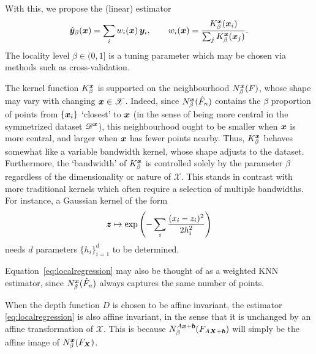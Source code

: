 With this, we propose the (linear) estimator
\begin{equation}
    \hat{\bm{y}}_\beta(\bm{x}) = \sum_i w_i(\bm{x})\, \bm{y}_i, \qquad
    w_i(\bm{x}) = \frac{K^{\bm{x}}_\beta(\bm{x}_i)}{\sum_j K^{\bm{x}}_\beta(\bm{x}_j)}.
    \label{eq:localregression}
\end{equation}
The locality level $\beta \in (0, 1]$ is a tuning parameter which may be
chosen via methods such as cross-validation.

The kernel function $K^{\bm{x}}_\beta$ is supported on the neighbourhood
$N^{\bm{x}}_\beta(F)$, whose shape may vary with changing $\bm{x} \in \mathscr{X}$.
Indeed, since $N^{\bm{x}}_\beta(\hat{F}_n)$ contains the $\beta$ proportion of
points from $\{\bm{x}_i\}$ `closest' to $\bm{x}$ (in the sense of being more central
in the symmetrized dataset $\mathscr{D}^{\bm{x}}$), this neighbourhood ought to
be smaller when $\bm{x}$ is more central, and larger when $\bm{x}$ has fewer points
nearby.
Thus, $K^{\bm{x}}_\beta$ behaves somewhat like a variable bandwidth kernel, whose
shape adjusts to the dataset.
Furthermore, the `bandwidth' of $K^{\bm{x}}_\beta$ is controlled solely by the
parameter $\beta$ regardless of the dimensionality or nature of $\mathscr{X}$.
This stands in contrast with more traditional kernels which often require a
selection of multiple bandwidths.
For instance, a Gaussian kernel of the form
\begin{equation}
    \bm{z} \mapsto \exp\left(-\sum_i \frac{(x_i - z_i)^2}{2h_i^2}\right)
    \label{eq:kernel_gaussian}
\end{equation}
needs $d$ parameters $\{h_i\}_{i = 1}^d$ to be determined.

Equation~\ref{eq:localregression} may also be thought of as a weighted KNN
estimator, since $N^{\bm{x}}_\beta(\hat{F}_n)$ always captures the same number of
points.

When the depth function $D$ is chosen to be affine invariant, the estimator
\ref{eq:localregression} is also affine invariant, in the sense that it is
unchanged by an affine transformation of $\mathscr{X}$.
This is because $N^{A\bm{x} + \bm{b}}_\beta(F_{A\bm{X} + \bm{b}})$ will simply be
the affine image of $N^{\bm{x}}_\beta(F_{\bm{X}})$.
